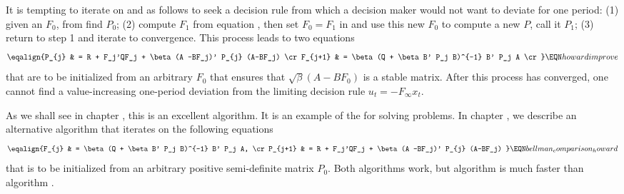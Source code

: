   It is tempting to iterate on   and   as follows
to seek a decision rule from which a decision maker would not want to
deviate for one period:
(1) given an $F_0$, from  find  $P_0$; (2) compute
$F_1$ from equation , then set  $F_0 = F_1$ in   and use this new $F_0$ to compute
a new $P$, call it $P_1$; (3) return to step 1 and iterate to convergence.
This process leads to  two equations
$$\eqalign{P_{j} & = R + F_j'QF_j + \beta (A -BF_j)' P_{j} (A-BF_j) \cr
 F_{j+1} & = \beta(Q + \beta B' P_j B)^{-1} B' P_j A \cr
 } \EQN howardimprove $$
that are to be initialized from an arbitrary
$F_0$ that ensures that $\sqrt{\beta}( A - B F_0)$ is a stable matrix.
After
this process has converged, one cannot find a value-increasing
one-period deviation
from the limiting decision rule $u_t = - F_\infty x_t$.


As we shall see in chapter ,   this is
an excellent algorithm. It is  an example of the   for solving  
problems.
In chapter , we describe an alternative algorithm that iterates on the following
equations
$$\eqalign{F_{j} & = \beta(Q + \beta B' P_j B)^{-1} B' P_j A, \cr
     P_{j+1} & = R + F_j'QF_j + \beta (A -BF_j)' P_{j} (A-BF_j) } \EQN bellman_comparison_howard $$
that is to be initialized from an arbitrary positive semi-definite matrix $P_0$.  Both algorithms work, but algorithm  is much faster than
algorithm .




